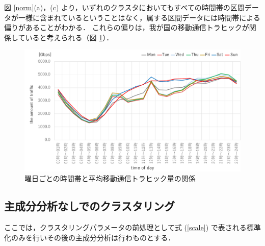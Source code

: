 \documentclass[a4j]{jarticle}
\begin{document}
図 \ref{norm}(a)，(c) より，いずれのクラスタにおいてもすべての時間帯の区間データが一様に含まれているということはなく，属する区間データには時間帯による偏りがあることがわかる．
これらの偏りは，我が国の移動通信トラヒックが関係していると考えられる（図 \ref{traffic}）\cite{soumutrafficstatics}．
\begin{figure}[tb]
\centering
\includegraphics[width=0.8\hsize]{traffic.pdf}
\caption{曜日ごとの時間帯と平均移動通信トラヒック量の関係}
\label{traffic}
\end{figure}

\subsection{主成分分析なしでのクラスタリング}
ここでは，クラスタリングパラメータの前処理として式 (\ref{scale}) で表される標準化のみを行いその後の主成分分析は行わものとする．
 
\end{document}
